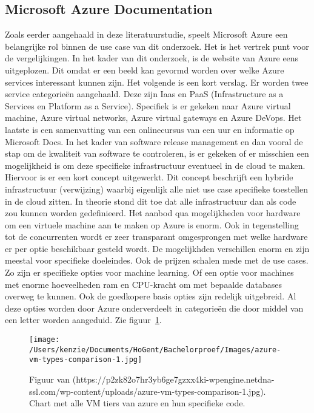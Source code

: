 \subsection{Microsoft Azure Documentation}
Zoals eerder aangehaald in deze literatuurstudie, speelt Microsoft Azure een belangrijke rol binnen de use case van dit onderzoek. Het is het vertrek punt voor de vergelijkingen. In het kader van dit onderzoek, is de website van Azure eens uitgeplozen. Dit omdat er een beeld kan gevormd worden over welke Azure services interessant kunnen zijn. Het volgende is een kort verslag. Er worden twee service categorieën aangehaald. Deze zijn Iaas en PaaS (Infrastructure as a Services en Platform as a Service). Specifiek is er gekeken naar Azure virtual machine, Azure virtual networks, Azure virtual gateways en Azure DeVops. Het laatste is een samenvatting van een onlinecursus van een uur en informatie op Microsoft Docs.
\newline
\newline
In het kader van software release management en dan vooral de stap om de kwaliteit van software te controleren, is er gekeken of er misschien een mogelijkheid is om deze specifieke infrastructuur eventueel in de cloud te maken. Hiervoor is er een kort concept uitgewerkt. Dit concept beschrijft een hybride infrastructuur (verwijzing) waarbij eigenlijk alle niet use case specifieke toestellen in de cloud zitten. In theorie stond dit toe dat alle infrastructuur dan als code zou kunnen worden gedefinieerd.
\newline
\newline
Het aanbod qua mogelijkheden voor hardware om een virtuele machine aan te maken op Azure is enorm. Ook in tegenstelling tot de concurrenten wordt er zeer transparant omgesprongen met welke hardware er per optie beschikbaar gesteld wordt. De mogelijkhden verschillen enorm en zijn meestal voor specifieke doeleindes. Ook de prijzen schalen mede met de use cases. Zo zijn er specifieke opties voor machine learning. Of een optie voor machines met enorme hoeveelheden ram en CPU-kracht om met bepaalde databases overweg te kunnen. Ook de goedkopere basis opties zijn redelijk uitgebreid. Al deze opties worden door Azure onderverdeelt in categorieën die door middel van een letter worden aangeduid. Zie figuur~\ref{fig:Chart_Azure_tiers}.
\begin{figure}[H]
    \centering
    \texttt{[image: /Users/kenzie/Documents/HoGent/Bachelorproef/Images/azure-vm-types-comparison-1.jpg]}
    \caption{Figuur van (https://p2zk82o7hr3yb6ge7gzxx4ki-wpengine.netdna-ssl.com/wp-content/uploads/azure-vm-types-comparison-1.jpg). Chart met alle VM tiers van azure en hun specifieke code.}
    \label{fig:Chart_Azure_tiers}
\end{figure}
